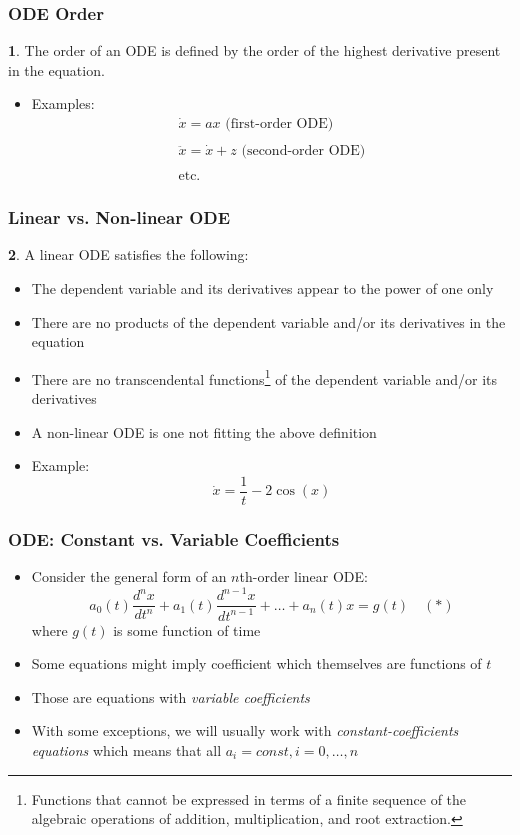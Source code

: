 \documentclass[10pt,usenames,dvipsnames]{beamer}
\theoremstyle{definition}
\newtheorem{definition}{\translate{Definition}}
\begin{document}
\begin{frame}[fragile]
\frametitle{ODE Order}
\begin{definition}
	The order of an ODE is defined by the order of the highest derivative present in the equation.
\end{definition}
\begin{itemize}
	\item Examples:
	\[
		\begin{array}{lcl}
			\dot{x} = ax \textrm{ (first-order ODE)}\\
			\quad\\
			\ddot{x} = \dot{x} + z \textrm{ (second-order ODE)}\\
			\quad\\
			\textrm{etc.}
		\end{array}
	\]
\end{itemize}
\end{frame}

\begin{frame}[fragile]
\frametitle{Linear vs. Non-linear ODE}
\begin{definition}
	A linear ODE satisfies the following:
	\begin{itemize}
	 	\item The dependent variable and its derivatives appear to the power of one only
	 	\item There are no products of the dependent variable and/or its derivatives in the equation
	 	\item There are no transcendental functions\footnote{Functions that cannot be expressed in terms of a finite sequence of the algebraic operations of addition, multiplication, and root extraction.} of the dependent variable and/or its derivatives
	 \end{itemize} 
\end{definition}
\begin{itemize}
	\item A non-linear ODE is one not fitting the above definition
	\item Example:
	\[
		\dot{x} = \dfrac{1}{t} -2\cos(x)
	\]
\end{itemize}
\end{frame}

\begin{frame}[fragile]
\frametitle{ODE: Constant vs. Variable Coefficients}
\begin{itemize}
	\item Consider the general form of an $n$th-order linear ODE:
	\[
		a_{0}(t)\dfrac{d^{n}x}{dt^{n}} + a_{1}(t)\dfrac{d^{n-1}x}{dt^{n-1}} + \ldots + a_{n}(t)x = g(t) \quad (*)
	\]
	where $g(t)$ is some function of time
	\item Some equations might imply coefficient which themselves are functions of $t$ 
	\item Those are equations with \textit{variable coefficients} 
	\item With some exceptions, we will usually work with \textit{constant-coefficients equations} which means that all $a_{i} = const,i = 0,\ldots,n$
\end{itemize}
\end{frame}
\end{document}

